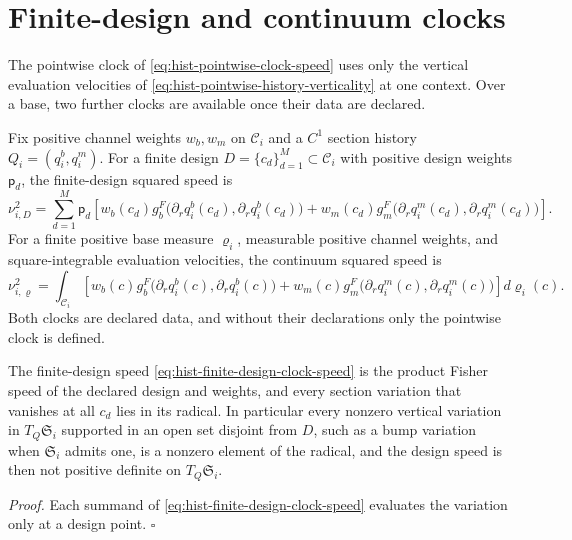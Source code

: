 \section{Finite-design and continuum clocks}

The pointwise clock of \eqref{eq:hist-pointwise-clock-speed} uses only the
vertical evaluation velocities of \eqref{eq:hist-pointwise-history-verticality}
at one context. Over a base, two further clocks are available once their data
are declared.

Fix positive channel weights \(w_b,w_m\) on \(\mathcal C_i\) and a \(C^1\)
section history \(Q_i=(q^b_i,q^m_i)\). For a finite design
\(D=\{c_d\}_{d=1}^M\subset\mathcal C_i\) with positive design weights
\(\mathsf p_d\), the finite-design squared speed is
\begin{equation}
\nu_{i,D}^2
=\sum_{d=1}^M\mathsf p_d\left[
w_b(c_d)g_b^F\bigl(\partial_rq^b_i(c_d),\partial_rq^b_i(c_d)\bigr)
+w_m(c_d)g_m^F\bigl(\partial_rq^m_i(c_d),\partial_rq^m_i(c_d)\bigr)
\right].
\label{eq:hist-finite-design-clock-speed}
\end{equation}
For a finite positive base measure \(\varrho_i\), measurable positive channel
weights, and square-integrable evaluation velocities, the continuum squared
speed is
\begin{equation}
\nu_{i,\varrho}^2
=\int_{\mathcal C_i}\left[
w_b(c)g_b^F\bigl(\partial_rq^b_i(c),\partial_rq^b_i(c)\bigr)
+w_m(c)g_m^F\bigl(\partial_rq^m_i(c),\partial_rq^m_i(c)\bigr)
\right]d\varrho_i(c).
\label{eq:hist-continuum-clock-speed}
\end{equation}
Both clocks are declared data, and without their declarations only the
pointwise clock is defined.

The finite-design speed \eqref{eq:hist-finite-design-clock-speed} is the product
Fisher speed of the declared design and weights, and every section variation
that vanishes at all \(c_d\) lies in its radical. In particular every nonzero
vertical variation in \(T_Q\mathfrak S_i\) supported in an open set disjoint from
\(D\), such as a bump variation when \(\mathfrak S_i\) admits one, is a nonzero
element of the radical, and the design speed is then not positive definite on
\(T_Q\mathfrak S_i\). 

\noindent\emph{Proof.}
Each summand of \eqref{eq:hist-finite-design-clock-speed} evaluates the
variation only at a design point. \(\square\)

